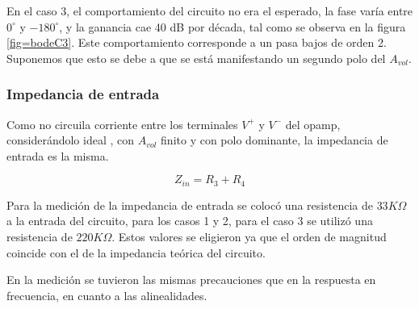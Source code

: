 \documentclass[../../main.tex]{subfiles}
\begin{document}
En el caso 3, el comportamiento del circuito no era el esperado, la fase varía entre $0^{\circ}$ y $-180^{\circ}$, y la ganancia cae  40 dB por década, tal como se observa en la figura \ref{fig=bodeC3}. Este comportamiento corresponde a un  pasa bajos de orden 2. Suponemos que esto se debe a que se está manifestando un segundo polo del $A_{vol}$.

\subsubsection{Impedancia de entrada}

Como no circuila corriente entre los terminales $V^{+}$ y $V^{-}$ del opamp, consider\'andolo ideal , con $A_{vol}$ finito y con polo dominante, la impedancia de entrada es la misma.

\begin{equation}
Z_{in}=R_{3} + R_{4}
\end{equation}

Para la medición de la impedancia de entrada se colocó una resistencia de $33K \Omega $ a la entrada del circuito, para los casos 1 y 2, para el caso 3 se utilizó una resistencia de $220 K\Omega $. Estos valores se eligieron ya que el orden de magnitud coincide con el de la impedancia teórica del circuito.\par

En la medición se tuvieron las mismas precauciones que en la respuesta en frecuencia, en cuanto a las alinealidades.
\end{document}
